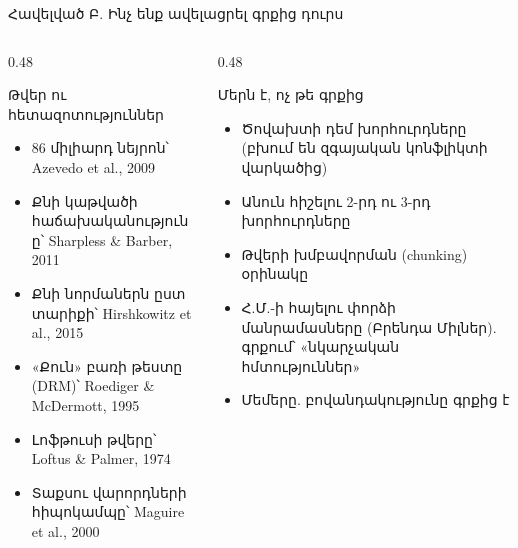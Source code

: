 \begin{frame}{Հավելված Բ. Ինչ ենք ավելացրել գրքից դուրս}
  \begin{columns}[T]
    \begin{column}{0.48\textwidth}
      \begin{card}[colback=mint!30!cardwhite, fontupper=\scriptsize]
        {\blackfont Թվեր ու հետազոտություններ}\par\smallskip
        \begin{itemize}\setlength{\itemsep}{0.5mm}
          \item 86 միլիարդ նեյրոն՝ Azevedo et al., 2009
          \item Քնի կաթվածի հաճախականությունը՝ Sharpless \& Barber, 2011
          \item Քնի նորմաներն ըստ տարիքի՝ Hirshkowitz et al., 2015
          \item «Քուն» բառի թեստը (DRM)՝ Roediger \& McDermott, 1995
          \item Լոֆթուսի թվերը՝ Loftus \& Palmer, 1974
          \item Տաքսու վարորդների հիպոկամպը՝ Maguire et al., 2000
        \end{itemize}
      \end{card}
    \end{column}
    \begin{column}{0.48\textwidth}
      \begin{card}[colback=peach!35!cardwhite, fontupper=\scriptsize]
        {\blackfont Մերն է, ոչ թե գրքից}\par\smallskip
        \begin{itemize}\setlength{\itemsep}{0.5mm}
          \item Ծովախտի դեմ խորհուրդները (բխում են զգայական կոնֆլիկտի վարկածից)
          \item Անուն հիշելու 2-րդ ու 3-րդ խորհուրդները
          \item Թվերի խմբավորման (chunking) օրինակը
          \item Հ.Մ.-ի հայելու փորձի մանրամասները (Բրենդա Միլներ). գրքում՝ «նկարչական հմտություններ»
          \item Մեմերը. բովանդակությունը գրքից է
        \end{itemize}
      \end{card}
    \end{column}
  \end{columns}
\end{frame}


